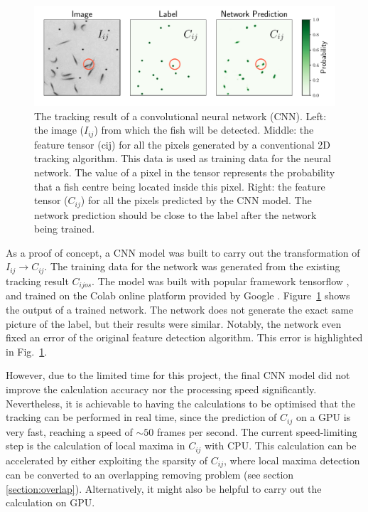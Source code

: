 \documentclass[11pt,twoside]{report}
\begin{document}
\begin{figure}
  \includegraphics[width=\linewidth]{locate-cnn}
  \caption[The feature tensor calculated with convolutional neural network]{
	The tracking result of a convolutional neural network (CNN).
	Left: the image ($I_{ij}$) from which the fish will be detected.
	Middle: the feature tensor (\gls{cij}) for all the pixels generated by a conventional 2D tracking algorithm. This data is used as training data for the neural network. The value of a pixel in the tensor represents the probability that a fish centre being located inside this pixel. 
	Right: the feature tensor ($C_{ij}$) for all the pixels predicted by the CNN model. The network prediction should be close to the label after the network being trained.
  }
  \label{fig:locate-cnn}
\end{figure}


As a proof of concept, a CNN model was built to carry out the transformation of $I_{ij} \rightarrow C_{ij}$. The training data for the network was generated from the existing tracking result $C_{ijos}$.
The model was built with popular framework tensorflow \cite{tensorflow2015}, and trained on the Colab online platform provided by Google \cite{carneiro2018}.
Figure~\ref{fig:locate-cnn} shows the output of a trained network. The network does not generate the exact same picture of the label, but their results were similar. Notably, the network even fixed an error of the original feature detection algorithm. This error is highlighted in Fig.~\ref{fig:locate-cnn}. 

However, due to the limited time for this project, the final CNN model did not improve the calculation accuracy nor the processing speed significantly. Nevertheless, it is achievable to having the calculations to be optimised that the tracking can be performed in real time, since the prediction of $C_{ij}$ on a GPU is very fast, reaching a speed of $\sim 50$ frames per second. The current speed-limiting step is the calculation of local maxima in $C_{ij}$ with CPU. This calculation can be accelerated by either exploiting the sparsity of $C_{ij}$, where local maxima detection can be converted to an overlapping removing problem (see section \ref{section:overlap}). Alternatively, it might also be helpful to carry out the calculation on GPU.
\end{document}
